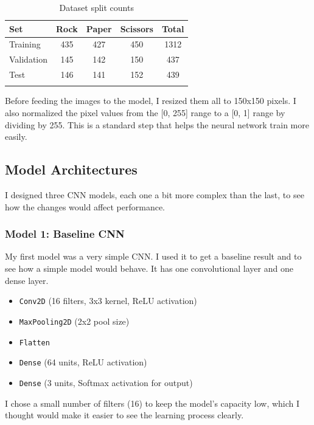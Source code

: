 \documentclass[pdflatex,sn-mathphys-num]{sn-jnl}%
\theoremstyle{thmstyleone}%
\theoremstyle{thmstyletwo}%
\theoremstyle{thmstylethree}%
\begin{document}
\begin{table}[htbp]
\caption{Dataset split counts}\label{tab:split}%
\begin{tabular}{@{}lcccc@{}}
\toprule
Set & Rock & Paper & Scissors & Total \\
\midrule
Training & 435 & 427 & 450 & 1312 \\
Validation & 145 & 142 & 150 & 437 \\
Test & 146 & 141 & 152 & 439 \\
\botrule
\end{tabular}
\end{table}

Before feeding the images to the model, I resized them all to 150x150 pixels. I also normalized the pixel values from the [0, 255] range to a [0, 1] range by dividing by 255. This is a standard step that helps the neural network train more easily.

\subsection{Model Architectures}
I designed three CNN models, each one a bit more complex than the last, to see how the changes would affect performance.

\subsubsection{Model 1: Baseline CNN}
My first model was a very simple CNN. I used it to get a baseline result and to see how a simple model would behave. It has one convolutional layer and one dense layer.
\begin{itemize}
    \item \texttt{Conv2D} (16 filters, 3x3 kernel, ReLU activation)
    \item \texttt{MaxPooling2D} (2x2 pool size)
    \item \texttt{Flatten}
    \item \texttt{Dense} (64 units, ReLU activation)
    \item \texttt{Dense} (3 units, Softmax activation for output)
\end{itemize}
I chose a small number of filters (16) to keep the model's capacity low, which I thought would make it easier to see the learning process clearly.
\end{document}
